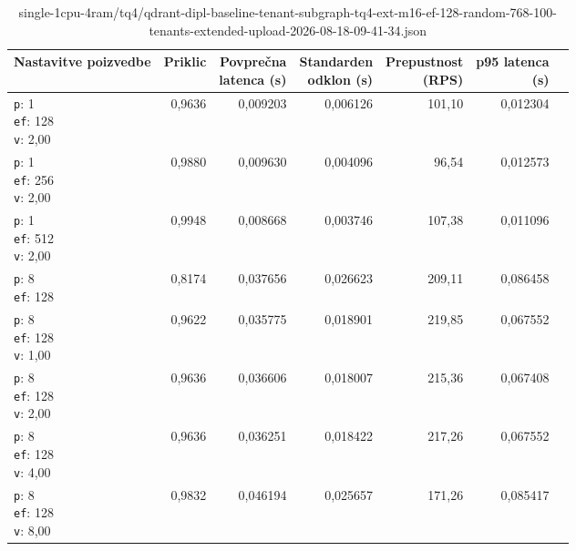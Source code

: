 \begin{table}[htbp]
  \centering
\small
  \caption{single-1cpu-4ram/tq4/qdrant-dipl-baseline-tenant-subgraph-tq4-ext-m16-ef-128-random-768-100-tenants-extended-upload-2026-08-18-09-41-34.json}
  \label{tab:single-1cpu-4ram:tq4:qdrant-dipl-baseline-tenant-subgraph-tq4-ext-m16-ef-128-random-768-100-tenants-extended-upload-2026-08-18-09-41-34.json}
  \begin{tabularx}{\textwidth}{Xrrrrrr}
    \toprule
    Nastavitve poizvedbe & Priklic & \makecell{Povprečna\\latenca (s)} & \makecell{Standarden\\odklon (s)} & \makecell{Prepustnost\\(RPS)} & \makecell{p95 latenca\\(s)}  \\
    \midrule
    \makecell{\texttt{p}: 1\\\texttt{ef}: 128\\\texttt{v}: 2,00} & 0,9636 & 0,009203 & 0,006126 & 101,10 & 0,012304 \\
    \makecell{\texttt{p}: 1\\\texttt{ef}: 256\\\texttt{v}: 2,00} & 0,9880 & 0,009630 & 0,004096 & 96,54 & 0,012573 \\
    \makecell{\texttt{p}: 1\\\texttt{ef}: 512\\\texttt{v}: 2,00} & 0,9948 & 0,008668 & 0,003746 & 107,38 & 0,011096 \\
    \makecell{\texttt{p}: 8\\\texttt{ef}: 128} & 0,8174 & 0,037656 & 0,026623 & 209,11 & 0,086458 \\
    \makecell{\texttt{p}: 8\\\texttt{ef}: 128\\\texttt{v}: 1,00} & 0,9622 & 0,035775 & 0,018901 & 219,85 & 0,067552 \\
    \makecell{\texttt{p}: 8\\\texttt{ef}: 128\\\texttt{v}: 2,00} & 0,9636 & 0,036606 & 0,018007 & 215,36 & 0,067408 \\
    \makecell{\texttt{p}: 8\\\texttt{ef}: 128\\\texttt{v}: 4,00} & 0,9636 & 0,036251 & 0,018422 & 217,26 & 0,067552 \\
    \makecell{\texttt{p}: 8\\\texttt{ef}: 128\\\texttt{v}: 8,00} & 0,9832 & 0,046194 & 0,025657 & 171,26 & 0,085417 \\

\end{tabularx}
\end{table}
